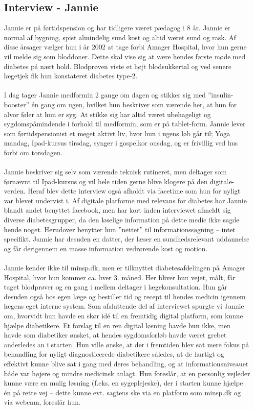 \subsection{Interview - Jannie}
Jannie er på førtidspension og har tidligere været pædagog i 8 år. Jannie er normal af bygning, spist almindelig sund kost og altid været sund og rask. Af disse årsager vælger hun i år 2002 at tage forbi Amager Hospital, hvor hun gerne vil melde sig som bloddoner. Dette skal vise sig at være hendes første møde med diabetes på nært hold. Blodprøven viste et højt blodsukkertal og ved senere lægetjek fik hun konstateret diabetes type-2.
\\ \\
I dag tager Jannie medformin 2 gange om dagen og stikker sig med ”insulin-booster” én gang om ugen, hvilket hun beskriver som værende her, at hun for alvor føler at hun er syg. At stikke sig har altid været ubehageligt og sygdomspåmindende i forhold til medformin, som er på tablet-form. Jannie lever som førtidspensionist et meget aktivt liv, hvor hun i ugens løb går til; Yoga mandag, Ipad-kursus tirsdag, synger i gospelkor onsdag, og er frivillig ved hus forbi om torsdagen.
\\ \\
Jannie beskriver sig selv som værende teknisk rutineret, men deltager som førnævnt til Ipad-kursus og vil hele tiden gerne blive klogere på den digitale-verden. Heraf blev dette interview også afholdt via facetime som hun for nyligt var blevet undervist i. Af digitale platforme med relevans for diabetes har Jannie blandt andet benyttet facebook, men har kort inden interviewet afmeldt sig diverse diabetesgrupper, da den løselige information på dette medie ikke sagde hende noget. Herudover benytter hun ”nettet” til informationssøgning – intet specifikt. Jannie har desuden en datter, der læser en sundhedsrelevant uddannelse og får derigennem en masse information vedrørende kost og motion.
\\ \\
Jannie kender ikke til minsp.dk, men er tilknyttet diabetesafdelingen på Amager Hospital, hvor hun kommer ca. hver 3. måned. Her bliver hun vejet, målt, får taget blodprøver og en gang i mellem deltager i lægekonsultation. Hun går desuden også hos egen læge og bestiller tid og recept til hendes medicin igennem lægens eget interne system.
Som afsluttende del af interviewet spurgte vi Jannie om, hvorvidt hun havde en skør idé til en fremtidig digital platform, som kunne hjælpe diabetikere. Et forslag til en ren digital løsning havde hun ikke, men havde som diabetiker ønsket, at hendes sygdomsforløb havde været grebet anderledes an i starten. Hun ville ønske, at der i fremtiden blev sat mere fokus på behandling for nyligt diagnosticerede diabetikere således, at de hurtigt og effektivt kunne blive sat i gang med deres behandling, og at informationsniveauet både var højere og mindre medicinsk anlagt. Hun foreslår, at en personlig vejleder kunne være en mulig løsning (f.eks. en sygeplejeske), der i starten kunne hjælpe én på rette vej – dette kunne evt. sagtens ske via en platform som minsp.dk og via webcam, foreslår hun.

